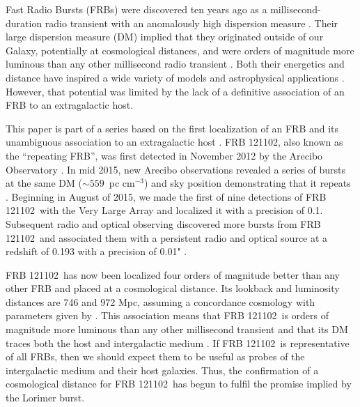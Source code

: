 \documentclass[twocolumn]{aastex61}
\newcommand{\frb}{FRB 121102}
\begin{document}
Fast Radio Bursts (FRBs) were discovered ten years ago as a millisecond-duration radio transient with an anomalously high dispersion measure \citep[the ``Lorimer burst'';][]{2007Sci...318..777L}. Their large dispersion measure (DM) implied that they originated outside of our Galaxy, potentially at cosmological distances, and were orders of magnitude more luminous than any other millisecond radio transient \citep{2013Sci...341...53T}. Both their energetics and distance have inspired a wide variety of models and astrophysical applications \citep[e.g.,][]{2014ApJ...780L..33M, 2014ApJ...797...70K, 2016MNRAS.458L..19C, 2016MNRAS.457..232C}. However, that potential was limited by the lack of a definitive association of an FRB to an extragalactic host.

This paper is part of a series based on the first localization of an FRB and its unambiguous association to an extragalactic host \citep{LOC, OPT, EVN}. \frb, also known as the ``repeating FRB'', was first detected in November 2012 by the Arecibo Observatory \citep{2014ApJ...790..101S}. In mid 2015, new Arecibo observations revealed a series of bursts at the same DM ($\sim559$\ pc cm$^{-3}$) and sky position demonstrating that it repeats \citep{2016Natur.531..202S}. Beginning in August of 2015, we made the first of nine detections of \frb\ with the Very Large Array \citep{LOC} and localized it with a precision of 0.1\arcsec. Subsequent radio and optical observing discovered more bursts from \frb\ and associated them with a persistent radio and optical source at a redshift of 0.193 with a precision of 0.01" \citep[$\sim40$\ pc]{OPT, EVN}.

\frb\ has now been localized four orders of magnitude better than any other FRB and placed at a cosmological distance. Its lookback and luminosity distances are 746 and 972 Mpc, assuming a concordance cosmology with parameters given by \citet{2016A&A...594A..13P}. This association means that \frb\ is orders of magnitude more luminous than any other millisecond transient and that its DM traces both the host and intergalactic medium \citep{OPT}. If \frb\ is representative of all FRBs, then we should expect them to be useful as probes of the intergalactic medium and their host galaxies. Thus, the confirmation of a cosmological distance for \frb\ has begun to fulfil the promise implied by the Lorimer burst.
\end{document}
